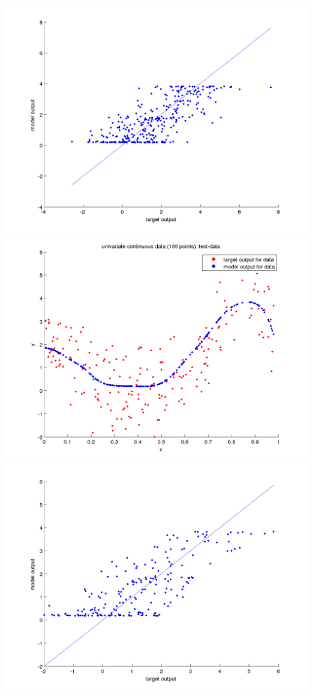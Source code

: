 \documentclass[fleqn]{article}
\begin{document}
\includegraphics[scale=0.4]{./pics/univariate100_morenoise/_6/_6_epoch_Inf_validation-data_scatter2d}
\includegraphics[scale=0.4]{./pics/univariate100_morenoise/_6/_6_epoch_Inf_test-data_scatter3d}
\includegraphics[scale=0.4]{./pics/univariate100_morenoise/_6/_6_epoch_Inf_test-data_scatter2d}
\end{document}
